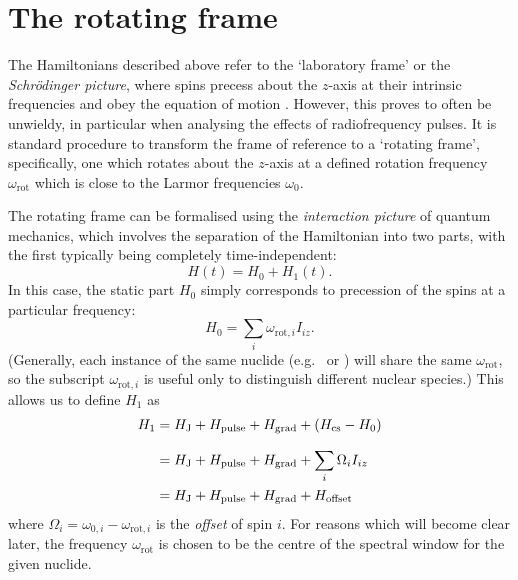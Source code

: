 \section{The rotating frame}
\label{sec:theory__rotating_frame}

The Hamiltonians described above refer to the `laboratory frame' or the \textit{Schr\"odinger picture}, where spins precess about the $z$-axis at their intrinsic frequencies and obey the equation of motion .
However, this proves to often be unwieldy, in particular when analysing the effects of radiofrequency pulses.
It is standard procedure to transform the frame of reference to a `rotating frame', specifically, one which rotates about the $z$-axis at a defined rotation frequency $\omega_\text{rot}$ which is close to the Larmor frequencies $\omega_0$.

The rotating frame can be formalised using the \textit{interaction picture} of quantum mechanics,\autocite{Sakurai2021} which involves the separation of the Hamiltonian into two parts, with the first typically being completely time-independent:
\begin{equation}
    \label{eq:interaction_ham}
    H(t) = H_0 + H_1(t).
\end{equation}
In this case, the static part $H_0$ simply corresponds to precession of the spins at a particular frequency:
\begin{equation}
    \label{eq:interaction_ham0}
    H_0 = \sum_i \omega_{\text{rot},i}I_{iz}.
\end{equation}
(Generally, each instance of the same nuclide (e.g.\ \proton{} or \carbon{}) will share the same $\omega_\text{rot}$, so the subscript $\omega_{\text{rot},i}$ is useful only to distinguish different nuclear species.)
This allows us to define $H_1$ as
\begin{align}
    \label{eq:reduced_ham}
    H_1 &= H_\text{J} + H_\text{pulse} + H_\text{grad} + \left(H_\text{cs} - H_0\right) \\[7pt] \notag
        &= H_\text{J} + H_\text{pulse} + H_\text{grad} + \sum_i \Omega_i I_{iz} \\ \notag
        &= H_\text{J} + H_\text{pulse} + H_\text{grad} + H_\text{offset}
\end{align}
where $\Omega_i = \omega_{0,i} - \omega_{\text{rot},i}$ is the \textit{offset} of spin $i$.
For reasons which will become clear later, the frequency $\omega_\text{rot}$ is chosen to be the centre of the spectral window for the given nuclide.

